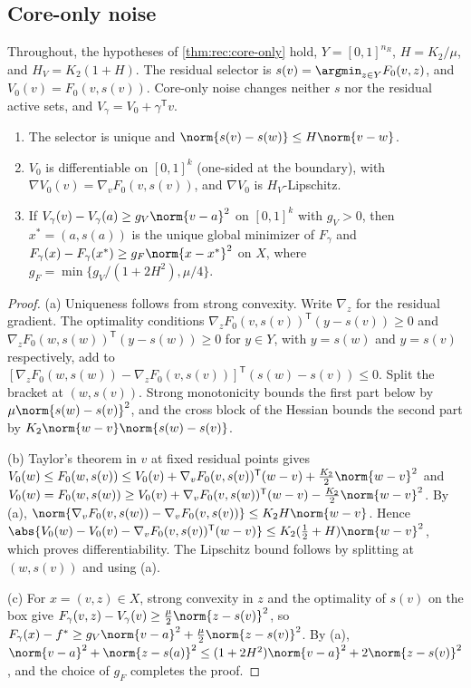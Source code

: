 \subsection{Core-only noise}\label{app:rec:core-only}

Throughout, the hypotheses of \cref{thm:rec:core-only} hold, $Y=[0,1]^{n_R}$,
$H=K_2/\mu$, and $H_V=K_2(1+H)$. The residual selector is
$s(v)=\argmin_{z\in Y}F_0(v,z)$, and $V_0(v)=F_0(v,s(v))$. Core-only noise
changes neither $s$ nor the residual active sets, and
$V_\gamma=V_0+\gamma^{\mathsf T}v$.

\begin{lemma}\label{lem:app:rec:lift}
\leavevmode
\begin{enumerate}[label=(\alph*)]
\item The selector is unique and $\norm{s(v)-s(w)}\le H\norm{v-w}$.
\item $V_0$ is differentiable on $[0,1]^k$ (one-sided at the boundary), with
$\nabla V_0(v)=\nabla_vF_0(v,s(v))$, and $\nabla V_0$ is $H_V$-Lipschitz.
\item If $V_\gamma(v)-V_\gamma(a)\ge g_V\norm{v-a}^2$ on $[0,1]^k$ with
$g_V>0$, then $x^*=(a,s(a))$ is the unique global minimizer of $F_\gamma$ and
$F_\gamma(x)-F_\gamma(x^*)\ge g_F\norm{x-x^*}^2$ on $X$, where
$g_F=\min\{g_V/(1+2H^2),\mu/4\}$.
\end{enumerate}
\end{lemma}

\begin{proof}
(a) Uniqueness follows from strong convexity. Write $\nabla_z$ for the
residual gradient. The optimality conditions
$\nabla_zF_0(v,s(v))^{\mathsf T}(y-s(v))\ge0$ and
$\nabla_zF_0(w,s(w))^{\mathsf T}(y-s(w))\ge0$ for $y\in Y$, with $y=s(w)$ and
$y=s(v)$ respectively, add to
$[\nabla_zF_0(w,s(w))-\nabla_zF_0(v,s(v))]^{\mathsf T}(s(w)-s(v))\le0$. Split
the bracket at $(w,s(v))$. Strong monotonicity bounds the first part below by
$\mu\norm{s(w)-s(v)}^2$, and the cross block of the Hessian bounds the second
part by $K_2\norm{w-v}\norm{s(w)-s(v)}$.

(b) Taylor's theorem in $v$ at fixed residual points gives
$V_0(w)\le F_0(w,s(v))\le V_0(v)+\nabla_vF_0(v,s(v))^{\mathsf T}(w-v)
+\frac{K_2}2\norm{w-v}^2$ and
$V_0(w)=F_0(w,s(w))\ge V_0(v)+\nabla_vF_0(v,s(w))^{\mathsf T}(w-v)
-\frac{K_2}2\norm{w-v}^2$. By (a),
$\norm{\nabla_vF_0(v,s(w))-\nabla_vF_0(v,s(v))}\le K_2H\norm{w-v}$. Hence
$\abs{V_0(w)-V_0(v)-\nabla_vF_0(v,s(v))^{\mathsf T}(w-v)}\le
K_2(\frac12+H)\norm{w-v}^2$, which proves differentiability. The Lipschitz
bound follows by splitting at $(w,s(v))$ and using (a).

(c) For $x=(v,z)\in X$, strong convexity in $z$ and the optimality of
$s(v)$ on the box give $F_\gamma(v,z)-V_\gamma(v)\ge\frac\mu2\norm{z-s(v)}^2$,
so $F_\gamma(x)-f^*\ge g_V\norm{v-a}^2+\frac\mu2\norm{z-s(v)}^2$. By (a),
$\norm{v-a}^2+\norm{z-s(a)}^2\le(1+2H^2)\norm{v-a}^2+2\norm{z-s(v)}^2$, and
the choice of $g_F$ completes the proof.
\end{proof}

